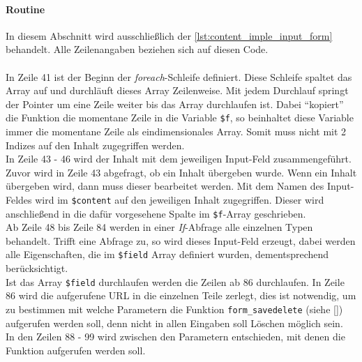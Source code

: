 

\paragraph{Routine\\}
In diesem Abschnitt wird ausschließlich der \autoref{lst:content_imple_input_form} behandelt. Alle Zeilenangaben beziehen sich auf diesen Code.\\
\\
In Zeile 41 ist der Beginn der \textit{foreach}-Schleife definiert. Diese Schleife spaltet das Array auf und durchläuft dieses Array Zeilenweise. Mit jedem Durchlauf springt der Pointer um eine Zeile weiter bis das Array durchlaufen ist. Dabei \enquote{kopiert} die Funktion die momentane Zeile in die Variable \texttt{\$f}, so beinhaltet diese Variable immer die momentane Zeile als eindimensionales Array. Somit muss nicht mit 2 Indizes auf den Inhalt zugegriffen werden.\\
In Zeile 43 - 46 wird der Inhalt mit dem jeweiligen Input-Feld zusammengeführt. Zuvor wird in Zeile 43 abgefragt, ob ein Inhalt übergeben wurde. Wenn ein Inhalt übergeben wird, dann muss dieser bearbeitet werden. Mit dem Namen des Input-Feldes wird im \texttt{\$content} auf den jeweiligen Inhalt zugegriffen. Dieser wird anschließend in die dafür vorgesehene Spalte im \texttt{\$f}-Array geschrieben.\\
Ab Zeile 48 bis Zeile 84 werden in einer \textit{If}-Abfrage alle einzelnen Typen behandelt. Trifft eine Abfrage zu, so wird dieses Input-Feld erzeugt, dabei werden alle Eigenschaften, die im \texttt{\$field} Array definiert wurden, dementsprechend berücksichtigt.\\
Ist das Array \texttt{\$field} durchlaufen werden die Zeilen ab 86 durchlaufen. In Zeile 86 wird die aufgerufene URL in die einzelnen Teile zerlegt, dies ist notwendig, um zu bestimmen mit welche Parametern die Funktion \texttt{form\_savedelete} (siehe \autoref{}) aufgerufen werden soll, denn nicht in allen Eingaben soll Löschen möglich sein.\\
In den Zeilen 88 - 99 wird zwischen den Parametern entschieden, mit denen die Funktion aufgerufen werden soll.

